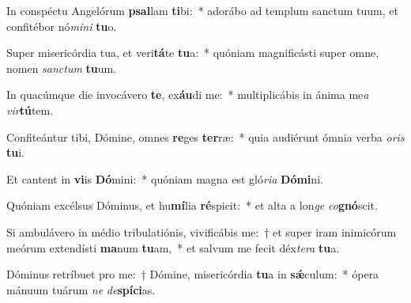 \item In conspéctu Angelórum \textbf{psal}lam \textbf{ti}bi:~* adorábo ad templum sanctum tuum, et confitébor nó\textit{mi}\textit{ni} \textbf{tu}o.
\item Super misericórdia tua, et veri\textbf{tá}te \textbf{tu}a:~* quóniam magnificásti super omne, nomen \textit{sanc}\textit{tum} \textbf{tu}um.
\item In quacúmque die invocávero \textbf{te}, ex\textbf{áu}di me:~* multiplicábis in ánima me\textit{a} \textit{vir}\textbf{tú}tem.
\item Confiteántur tibi, Dómine, omnes \textbf{re}ges \textbf{ter}ræ:~* quia audiérunt ómnia verba \textit{o}\textit{ris} \textbf{tu}i.
\item Et cantent in \textbf{vi}is \textbf{Dó}mini:~* quóniam magna est gló\textit{ri}\textit{a} \textbf{Dó}\textbf{mi}ni.
\item Quóniam excélsus Dóminus, et hu\textbf{mí}lia \textbf{ré}spicit:~* et alta a lon\textit{ge} \textit{co}\textbf{gnó}scit.
\item Si ambulávero in médio tribulatiónis, vivificábis me:~† et super iram inimicórum meórum extendísti \textbf{ma}num \textbf{tu}am,~* et salvum me fecit déx\textit{te}\textit{ra} \textbf{tu}a.
\item Dóminus retríbuet pro me:~† Dómine, misericórdia \textbf{tu}a in \textbf{sǽ}culum:~* ópera mánuum tuárum \textit{ne} \textit{de}\textbf{spí}\textbf{ci}as.
